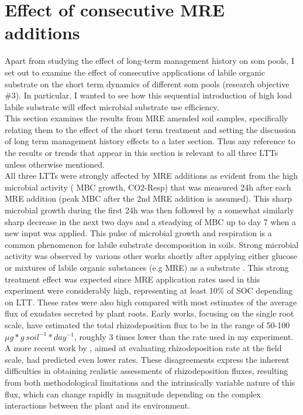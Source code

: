 \section{Effect of consecutive MRE additions}
Apart from studying the effect of long-term management history on \gls{som} pools, I set out to examine the effect of consecutive applications of labile organic substrate on the short term dynamics of different \gls{som} pools (research objective \#3). In particular, I wanted to see how this sequential introduction of high load labile substrate will effect microbial substrate use efficiency.\\
This section examines the results from MRE amended soil samples, specifically relating them to the effect of the short term treatment and setting the discussion of long term management history effects to a later section. Thus any reference to the results or trends that appear in this section is relevant to all three LTTs unless otherwise mentioned.\\
All three LTTs were strongly affected by MRE additions as evident from the high microbial activity ( MBC growth, CO2-Resp) that was measured 24h after each MRE addition (peak MBC after the 2nd MRE addition is assumed). This sharp microbial growth during the first 24h was then followed by a somewhat similarly sharp decrease  in the next two days and a steadying of MBC up to day 7 when a new input was applied. This pulse of microbial growth and respiration is a common phenomenon for labile substrate decomposition in soils.
Strong microbial activity was  observed by various other works shortly after applying either glucose or mixtures of labile organic substances (e.g MRE) as a substrate \citep{hill2008, landi2006, traore2000}.
This strong treatment effect was expected since MRE application rates used in this experiment were considerably high, representing at least 10\% of SOC depending on LTT. These rates were also high compared with most estimates of the average flux of exudates secreted by plant roots. Early works, focusing on the single root scale, have estimated the total rhizodeposition flux to be in the range of 50-100 $ \mu g * g\ soil^{-1} * day^{-1} $, roughly 3 times lower than the rate used in my experiment. A more recent work by \citet{pausch2018}, aimed at evaluating rhizodeposition rate at the field scale, had predicted even lower rates. These disagreements express the inherent difficulties in obtaining realistic assessments of rhizodeposition fluxes, resulting from both methodological limitations and the intrinsically variable nature of this flux, which can change rapidly in magnitude depending  on the complex interactions between the plant and its environment.

